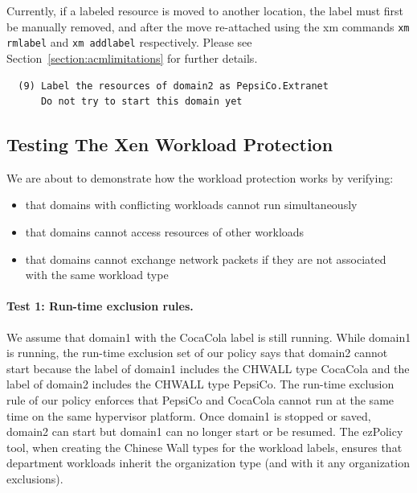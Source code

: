 \documentclass[11pt,twoside,final,openright]{report}
\begin{document}
Currently, if a labeled resource is moved to another location, the
label must first be manually removed, and after the move re-attached
using the xm commands \verb|xm rmlabel| and \verb|xm addlabel|
respectively.  Please see Section~\ref{section:acmlimitations} for
further details.

\begin{verbatim}
  (9) Label the resources of domain2 as PepsiCo.Extranet
      Do not try to start this domain yet
\end{verbatim}

\subsection{Testing The Xen Workload Protection}
\label{subsection:acmexampletest}
We are about to demonstrate how the workload protection works by
verifying:
\begin{itemize}
\item that domains with conflicting workloads cannot run
  simultaneously
\item that domains cannot access resources of other workloads
\item that domains cannot exchange network packets if they are not
  associated with the same workload type
\end{itemize}

\paragraph{Test 1: Run-time exclusion rules.} We assume that domain1
with the CocaCola label is still running. While domain1 is running,
the run-time exclusion set of our policy says that domain2 cannot
start because the label of domain1 includes the CHWALL type CocaCola
and the label of domain2 includes the CHWALL type PepsiCo. The
run-time exclusion rule of our policy enforces that PepsiCo and
CocaCola cannot run at the same time on the same hypervisor platform.
Once domain1 is stopped or saved, domain2 can start but domain1 can no
longer start or be resumed. The ezPolicy tool, when creating the
Chinese Wall types for the workload labels, ensures that department
workloads inherit the organization type (and with it any organization
exclusions).
\end{document}
